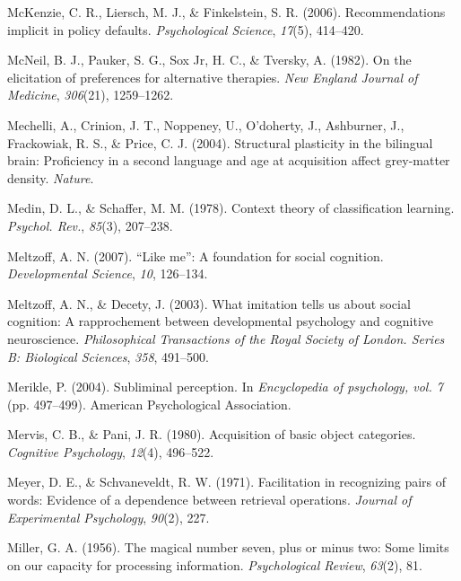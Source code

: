 \documentclass[
]{krantz}
\newlength{\cslhangindent}
\newenvironment{CSLReferences}[2] %
 {\begin{list}{}{%
  \setlength{\itemindent}{0pt}
  \setlength{\leftmargin}{0pt}
  \setlength{\parsep}{0pt}
  \ifodd #1
   \setlength{\leftmargin}{\cslhangindent}
   \setlength{\itemindent}{-1\cslhangindent}
  \fi
  \setlength{\itemsep}{#2\baselineskip}}}
 {\end{list}}
\begin{document}
\begin{CSLReferences}{1}{0}
McKenzie, C. R., Liersch, M. J., \& Finkelstein, S. R. (2006). Recommendations implicit in policy defaults. \emph{Psychological Science}, \emph{17}(5), 414--420.

McNeil, B. J., Pauker, S. G., Sox Jr, H. C., \& Tversky, A. (1982). On the elicitation of preferences for alternative therapies. \emph{New England Journal of Medicine}, \emph{306}(21), 1259--1262.

Mechelli, A., Crinion, J. T., Noppeney, U., O'doherty, J., Ashburner, J., Frackowiak, R. S., \& Price, C. J. (2004). Structural plasticity in the bilingual brain: Proficiency in a second language and age at acquisition affect grey-matter density. \emph{Nature}.

Medin, D. L., \& Schaffer, M. M. (1978). Context theory of classification learning. \emph{Psychol. Rev.}, \emph{85}(3), 207--238.

Meltzoff, A. N. (2007). {``Like me''}: A foundation for social cognition. \emph{Developmental Science}, \emph{10}, 126--134.

Meltzoff, A. N., \& Decety, J. (2003). What imitation tells us about social cognition: A rapprochement between developmental psychology and cognitive neuroscience. \emph{Philosophical Transactions of the Royal Society of London. Series B: Biological Sciences}, \emph{358}, 491--500.

Merikle, P. (2004). Subliminal perception. In \emph{Encyclopedia of psychology, vol. 7} (pp. 497--499). American Psychological Association.

Mervis, C. B., \& Pani, J. R. (1980). Acquisition of basic object categories. \emph{Cognitive Psychology}, \emph{12}(4), 496--522.

Meyer, D. E., \& Schvaneveldt, R. W. (1971). Facilitation in recognizing pairs of words: Evidence of a dependence between retrieval operations. \emph{Journal of Experimental Psychology}, \emph{90}(2), 227.

Miller, G. A. (1956). The magical number seven, plus or minus two: Some limits on our capacity for processing information. \emph{Psychological Review}, \emph{63}(2), 81.


\end{CSLReferences}
\end{document}
